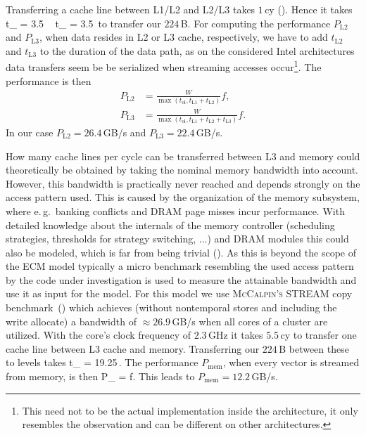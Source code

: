 Transferring a cache line between L1/L2 and L2/L3 takes $1$\,cy (\cite{intel-orm-2016}). Hence it takes
%
\be
  t_ = 3.5\,\cyw\ \ t_ = 3.5\,\cyw
\ee
%
to transfer our $224$\,B.
For computing the performance $P_\text{L2}$ and $P_\text{L3}$, when data resides
in L2 or L3 cache, respectively, we
have to add $t_\text{L2}$ and $t_\text{L3}$ to the duration of the data path, as on the considered
Intel architectures data transfers seem be be serialized when streaming accesses
occur\footnote{This need not to be the actual implementation inside the
architecture, it only resembles the observation and can be different on other
architectures.}.
The performance is then
%
\begin{align}
  P_\text{L2} &= \frac{W}{\max(t_\text{ol}, t_\text{L1} + t_\text{L2})} f, \\
  P_\text{L3} &= \frac{W}{\max(t_\text{ol}, t_\text{L1} + t_\text{L2} +
t_\text{L3})} f.
\end{align}
%
In our case $P_\text{L2} = 26.4$\,GB/s and $P_\text{L3} = 22.4$\,GB/s.
%

How many cache lines per cycle can be transferred between L3 and memory could
theoretically be obtained by taking the nominal memory bandwidth into account.
However, this bandwidth is practically never reached and depends strongly on the
access pattern used.
This is caused by the organization of the memory subsystem, where e.\,g.\ banking
conflicts and DRAM page misses incur performance.
With detailed knowledge about the internals of the memory controller
(scheduling strategies, thresholds for strategy switching, ...) and DRAM modules
this could also be modeled, which is far from being trivial (\cite{jacob-2007}).
As this is beyond the scope of the ECM model typically a micro benchmark
resembling the used access pattern by the code under investigation is used
to measure the attainable bandwidth and use it as input for the model.
%
For this model we use \textsc{McCalpin's} STREAM copy
benchmark~(\cite{mccalpin-1995}) which achieves (without nontemporal stores and
including the write allocate) a bandwidth of $\approx 26.9$\,GB/s when all cores
of a cluster are utilized.
With the core's clock frequency of $2.3$\,GHz it takes $5.5$\,cy to transfer one
cache line between L3 cache and memory.
Transferring our $224$\,B between these to levels takes
%
\be
  t_ = 19.25\,\cyw.
\ee
%
The performance $P_\text{mem}$, when every vector is streamed from memory, is then
%
\be
  P_ =  f.
\ee
%
This leads to $P_\text{mem} = 12.2$\,GB/s. 


